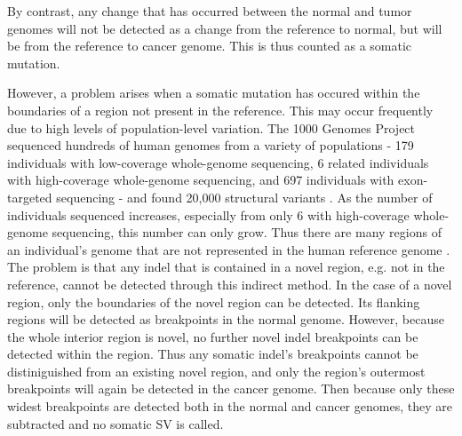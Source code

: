 \documentclass{easychithesis}
\begin{document}
By contrast, any change that has occurred between the normal and tumor genomes will not be detected as a change from the reference to normal, but will be from the reference to cancer genome. This is thus counted as a somatic mutation.

However, a problem arises when a somatic mutation has occured within the boundaries of a region not present in the reference. This may occur frequently due to high levels of population-level variation. The 1000 Genomes Project sequenced hundreds of human genomes from a variety of populations - 179 individuals with low-coverage whole-genome sequencing, 6 related individuals with high-coverage whole-genome sequencing, and 697 individuals with exon-targeted sequencing - and found 20,000 structural variants \cite{10002010map}. As the number of individuals sequenced increases, especially from only 6 with high-coverage whole-genome sequencing, this number can only grow. Thus there are many regions of an individual's genome that are not represented in the human reference genome \cite{feuk2006structural}. The problem is that any indel that is contained in a novel region, e.g. not in the reference, cannot be detected through this indirect method. In the case of a novel region, only the boundaries of the novel region can be detected. Its flanking regions will be detected as breakpoints in the normal genome. However, because the whole interior region is novel, no further novel indel breakpoints can be detected within the region. Thus any somatic indel's breakpoints cannot be distiniguished from an existing novel region, and only the region's outermost breakpoints will again be detected in the cancer genome. Then because only these widest breakpoints are detected both in the normal and cancer genomes, they are subtracted and no somatic SV is called.
\end{document}
